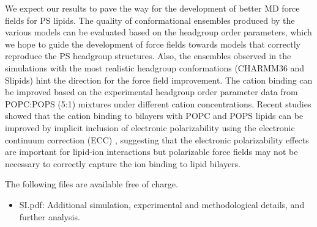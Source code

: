 \documentclass[journal=jpcbfk,manuscript=article]{achemso}
\begin{document}
We expect our results to pave the way for the development of better MD force fields for PS lipids.
The quality of conformational ensembles produced by the various models can be evaluated
based on the headgroup order parameters, which we hope to guide the development of force fields towards
models that correctly reproduce the PS headgroup structures. Also, the ensembles observed in the simulations
with the most realistic headgroup conformations (CHARMM36 and Slipids) hint the direction for the force
field improvement. The cation binding can be improved based on the experimental headgroup order parameter
data from POPC:POPS (5:1) mixtures under different cation concentrations. Recent studies showed that the
cation binding to bilayers with POPC and POPS lipids can be improved by implicit inclusion of electronic
polarizability using the electronic continuum correction (ECC) \cite{melcr18,ECCpops}, suggesting that
the electronic polarizability effects are important for lipid-ion interactions but polarizable force fields
may not be necessary to correctly capture the ion binding to lipid bilayers.

\begin{suppinfo} 
 
 
The following files are available free of charge. 
\begin{itemize} 
  \item SI.pdf: Additional simulation, experimental and methodological details, and further analysis. 
\end{itemize} 
 
\end{suppinfo} 
\end{document}
